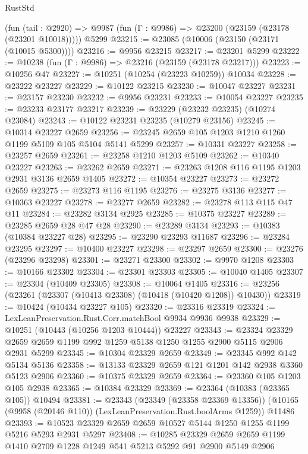 \begin{lexlean}{RustStd}
\begin{coremodule}
    (fun (tail : @2920) => @9987 (fun (Γ : @9986) => @23200 (@23159 (@23178 (@23201 @10018)))))
    @5299
@23215 := @23085 (@10006 (@23150 (@23171 (@10015 @5300))))
@23216 := @9956 @23215
@23217 := @23201 @5299
@23222 := @10238 (fun (Γ : @9986) => @23216 (@23159 (@23178 @23217)))
@23223 := @10256 @47
@23227 := @10251 (@10254 (@23223 @10259)) @10034
@23228 := @23222 @23227
@23229 := @10122 @23215
@23230 := @10047 @23227
@23231 := @23157 @23230
@23232 := @9956 @23231
@23233 := @10054 @23227
@23235 := @23233 @23177 @23217
@23239 := @23229 (@23232 @23235) (@10274 @23084)
@23243 := @10122 @23231 @23235 (@10279 @23156)
@23245 := @10314 @23227 @2659
@23256 := @23245 @2659 @105 @1203 @1210 @1260 @1199 @5109 @105 @5104 @5141 @5299
@23257 := @10331 @23227
@23258 := @23257 @2659
@23261 := @23258 @1210 @1203 @5109
@23262 := @10340 @23227
@23263 := @23262 @2659
@23271 := @23263 @1208 @116 @1195 @1203 @2931 @3136 @2659 @1405
@23272 := @10354 @23227
@23273 := @23272 @2659
@23275 := @23273 @116 @1195
@23276 := @23275 @3136
@23277 := @10363 @23227
@23278 := @23277 @2659
@23282 := @23278 @113 @115 @47 @11
@23284 := @23282 @3134 @2925
@23285 := @10375 @23227
@23289 := @23285 @2659 @28 @47 @28
@23290 := @23289 @3134
@23293 := @10383 (@10384 @23227 @28)
@23295 := @23290 @23293 @11687
@23296 := @23284 @23295
@23297 := @10400 @23227
@23298 := @23297 @2659
@23300 := @23276 (@23296 @23298)
@23301 := @23271 @23300
@23302 := @9970 @1208
@23303 := @10166 @23302
@23304 := @23301 @23303
@23305 := @10040 @1405
@23307 := @23304 (@10409 @23305)
@23308 := @10064 @1405
@23316 := @23256 (@23261 (@23307 (@10413 @23308) (@10418 (@10420 @1208)) @10430))
@23319 := @10424 (@10434 @23227 @105)
@23320 := @23316 @23319
@23324 := LexLeanPreservation.Rust.Corr.matchBool @9934 @9936 @9938
@23329 := @10251 (@10443 (@10256 @1203 @10444)) @23227
@23343 := @23324 @23329 @2659 @2659 @1199 @992 @1259 @5138 @1250 @1255 @2900 @5115 @2906 @2931 @5299
@23345 := @10304 @23329 @2659
@23349 := @23345 @992 @142 @5134 @5136
@23358 := @13133 @23329 @2659 @121 @1201 @142 @2938 @3360 @5123 @2906
@23360 := @10375 @23329 @2659
@23364 := @23360 @105 @1203 @105 @2938
@23365 := @10384 @23329
@23369 := @23364 (@10383 (@23365 @105)) @10494
@23381 := @23343
    (@23349 (@23358 @23369 @13356))
    (@10165 (@9958 (@20146 @110)) (LexLeanPreservation.Rust.boolArms @1259))
    @11486
@23393 := @10523 @23329 @2659 @2659 @10527 @5144 @1250 @1255 @1199 @5216 @5293 @2931 @5297
@23408 := @10285
    @23329
    @2659
    @2659
    @1199
    @1410
    @2709
    @1228
    @1249
    @541
    @5213
    @5292
    @91
    @2900
    @5149
    @2906

\end{coremodule}
\end{lexlean}
